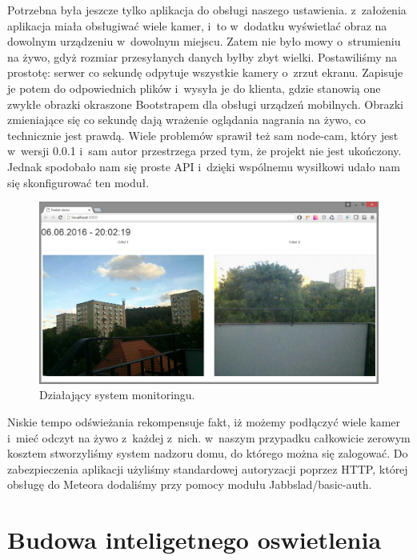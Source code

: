 \documentclass{xmgr}
\begin{document}
	Potrzebna była jeszcze tylko aplikacja do obsługi naszego ustawienia. z~założenia aplikacja miała obsługiwać wiele kamer, i~to w~dodatku wyświetlać obraz na dowolnym urządzeniu w~dowolnym miejscu. Zatem nie było mowy o~strumieniu na żywo, gdyż rozmiar przesyłanych danych byłby zbyt wielki. Postawiliśmy na prostotę: serwer co sekundę odpytuje wszystkie kamery o~zrzut ekranu. Zapisuje je potem do odpowiednich plików i~wysyła je do klienta, gdzie stanowią one zwykłe obrazki okraszone Bootstrapem dla obsługi urządzeń mobilnych. Obrazki zmieniające się co sekundę dają wrażenie oglądania nagrania na żywo, co technicznie jest prawdą.
	Wiele problemów sprawił też sam node-cam, który jest w~wersji 0.0.1 i~sam autor przestrzega przed tym, że projekt nie jest ukończony. Jednak spodobało nam się proste API i~dzięki wspólnemu wysiłkowi udało nam się skonfigurować ten moduł.
\begin{figure}[h]
\centering
\includegraphics[width=12cm]{m_cam}
\caption{Działający system monitoringu.}
\label{fig:cam}
\end{figure} 

	Niskie tempo odświeżania rekompensuje fakt, iż możemy podłączyć wiele kamer i~mieć odczyt na żywo z~każdej z~nich. w~naszym przypadku całkowicie zerowym kosztem stworzyliśmy system nadzoru domu, do którego można się zalogować. Do zabezpieczenia aplikacji użyliśmy standardowej autoryzacji poprzez HTTP, której obsługę do Meteora dodaliśmy przy pomocy modułu Jabbslad/basic-auth.

\section{Budowa inteligetnego oswietlenia}
\end{document}

